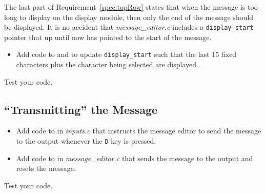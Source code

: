 The last part of Requirement~\ref{spec:topRow} states that when the message is too long to display on the display module, then only the end of the message should be displayed.
It is no accident that \textit{message\_editor.c} includes a \lstinline{display_start} pointer that up until now has pointed to the start of the message.
\begin{itemize}
    \item Add code to  and  to update \lstinline{display_start} such that the last 15 fixed characters plus the character being selected are displayed.
\end{itemize}

Test your code.

\subsection{``Transmitting'' the Message}

\begin{itemize}
    \item Add code to  in \textit{inputs.c} that instructs the message editor to send the message to the output whenever the \texttt{D} key is pressed.
    \item Add code to  in \textit{message\_editor.c} that sends the message to the output and resets the message.
\end{itemize}

Test your code.
